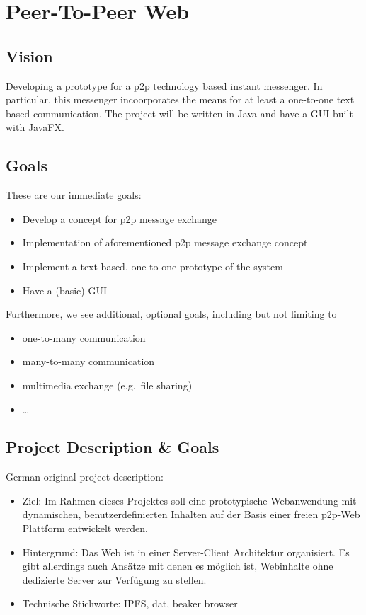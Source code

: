 \section{Peer-To-Peer Web}\label{peer-to-peer-web}

\subsection{Vision}\label{vision}

Developing a prototype for a p2p technology based instant messenger. In
particular, this messenger incoorporates the means for at least a
one-to-one text based communication. The project will be written in Java
and have a GUI built with JavaFX.

\subsection{Goals}\label{goals}

These are our immediate goals:

\begin{itemize}
\tightlist
\item
  Develop a concept for p2p message exchange
\item
  Implementation of aforementioned p2p message exchange concept
\item
  Implement a text based, one-to-one prototype of the system
\item
  Have a (basic) GUI
\end{itemize}

Furthermore, we see additional, optional goals, including but not
limiting to

\begin{itemize}
\tightlist
\item
  one-to-many communication
\item
  many-to-many communication
\item
  multimedia exchange (e.g.~file sharing)
\item
  \ldots{}
\end{itemize}

\subsection{Project Description \&
Goals}\label{project-description-goals}

German original project description:

\begin{itemize}
\tightlist
\item
  Ziel: Im Rahmen dieses Projektes soll eine prototypische Webanwendung
  mit dynamischen, benutzerdefinierten Inhalten auf der Basis einer
  freien p2p-Web Plattform entwickelt werden.
\item
  Hintergrund: Das Web ist in einer Server-Client Architektur
  organisiert. Es gibt allerdings auch Ansätze mit denen es möglich ist,
  Webinhalte ohne dedizierte Server zur Verfügung zu stellen.
\item
  Technische Stichworte: IPFS, dat, beaker browser
\end{itemize}

